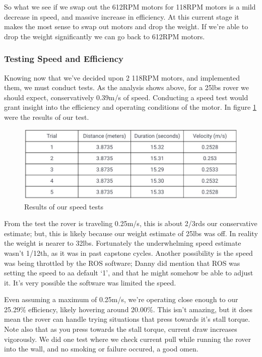 \documentclass[a4paper, 10pt]{article}
\begin{document}
		So what we see if we swap out the 612RPM motors for 118RPM motors is a mild decrease in speed, and massive increase in efficiency. At this current stage it makes the most sense to swap out motors and drop the weight. If we're able to drop the weight significantly we can go back to 612RPM motors. 
		
		\subsubsection*{Testing Speed and Efficiency}
		Knowing now that we've decided upon 2 118RPM motors, and implemented them, we must conduct tests. As the analysis shows above, for a 25lbs rover we should expect, conservatively 0.39m/s of speed. Conducting a speed test would grant insight into the efficiency and operating conditions of the motor. In figure \ref{speed_tests} were the results of our test.
		
		\begin{figure} [!h]
			\centering
			\includegraphics[scale=0.5]{Photos/speed_test}
			\caption{Results of our speed tests}
			\label{speed_tests}
		\end{figure}
		
		From the test the rover is traveling 0.25m/s, this is about 2/3rds our conservative estimate; but, this is likely because our weight estimate of 25lbs was off. In reality the weight is nearer to 32lbs. Fortunately the underwhelming speed estimate wasn't 1/12th, as it was in past capstone cycles. Another possibility is the speed was being throttled by the ROS software; Danny did mention that ROS was setting the speed to aa default `1', and that he might somehow be able to adjust it. It's very possible the software was limited the speed.
		
		Even assuming a maximum of 0.25m/s, we're operating close enough to our 25.29\% efficiency, likely hovering around 20.00\%. This isn't amazing, but it does mean the rover can handle trying situations that press towards it's stall torque. Note also that as you press towards the stall torque, current draw increases vigorously. We did one test where we check current pull while running the rover into the wall, and no smoking or failure occured, a good omen.
	
\end{document}
